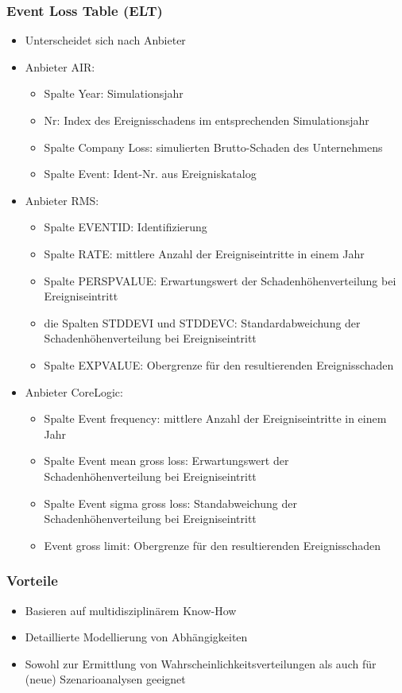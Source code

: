 \documentclass[12pt]{report}
\theoremstyle{dotless}
\theoremstyle{definition}
\begin{document}
\subsubsection{Event Loss Table (ELT)}
\begin{itemize}
\item Unterscheidet sich nach Anbieter
\item Anbieter AIR:
\begin{itemize}
\item Spalte Year: Simulationsjahr
\item Nr: Index des Ereignisschadens im entsprechenden Simulationsjahr
\item Spalte Company Loss: simulierten Brutto-Schaden des Unternehmens
\item Spalte Event: Ident-Nr. aus Ereigniskatalog
\end{itemize}
\item Anbieter RMS:
\begin{itemize}
\item Spalte EVENTID: Identifizierung
\item Spalte RATE: mittlere Anzahl der Ereigniseintritte in einem Jahr
\item Spalte PERSPVALUE: Erwartungswert der Schadenhöhenverteilung bei Ereigniseintritt
\item die Spalten STDDEVI und STDDEVC: Standardabweichung der Schadenhöhenverteilung bei Ereigniseintritt
\item Spalte EXPVALUE: Obergrenze für den resultierenden Ereignisschaden
\end{itemize}
\item Anbieter CoreLogic:
\begin{itemize}
\item Spalte Event frequency: mittlere Anzahl der Ereigniseintritte in einem Jahr
\item  Spalte Event mean gross loss: Erwartungswert der Schadenhöhenverteilung bei
Ereigniseintritt
\item Spalte Event sigma gross loss: Standabweichung der Schadenhöhenverteilung bei
Ereigniseintritt
\item Event gross limit: Obergrenze für den resultierenden Ereignisschaden
\end{itemize}
\end{itemize}




\subsubsection{Vorteile}
\begin{itemize}
\item Basieren auf multidisziplinärem Know-How
\item Detaillierte Modellierung von Abhängigkeiten
\item Sowohl zur Ermittlung von Wahrscheinlichkeitsverteilungen als auch für (neue) Szenarioanalysen geeignet
\end{itemize}
\end{document}
